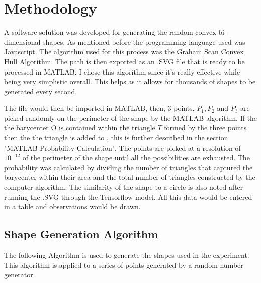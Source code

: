 \documentclass[9pt,onecolumn,oneside]{osajnl}
\begin{document}
\section{Methodology}

	A software solution was developed for generating the random convex bi-dimensional shapes. As mentioned before the programming language used was Javascript. The algorithm used for this process was the Graham Scan Convex Hull Algorithm. The path is then exported as an .SVG file that is ready to be processed in MATLAB. I chose this algorithm since it's really effective while being very simplistic overall. This helps as it allows for thousands of shapes to be generated every second. 

	The file would then be imported in MATLAB, then, 3 points,  \(P_{1}, P_{2}\)  and \(P_{3}\) are picked randomly on the perimeter of the shape by the MATLAB algorithm. If the the barycenter O is contained within the triangle \(T\) formed by the three points then the the triangle is added to , this is further described in the section "MATLAB Probability Calculation". The points are picked at a resolution of \( 10^{-12}\) of the perimeter of the shape until all the possibilities are exhausted.  The probability was calculated by dividing the number of triangles that captured the barycenter within their area and the total number of triangles constructed by the computer algorithm. The similarity of the shape to a circle is also noted after running the .SVG through the Tensorflow model. All this data would be entered in a table and observations would be drawn.

\subsection{Shape Generation Algorithm}

	The following Algorithm is used to generate the shapes used in the experiment. This algorithm is applied to a series of points generated by a random number generator. 
\end{document}
